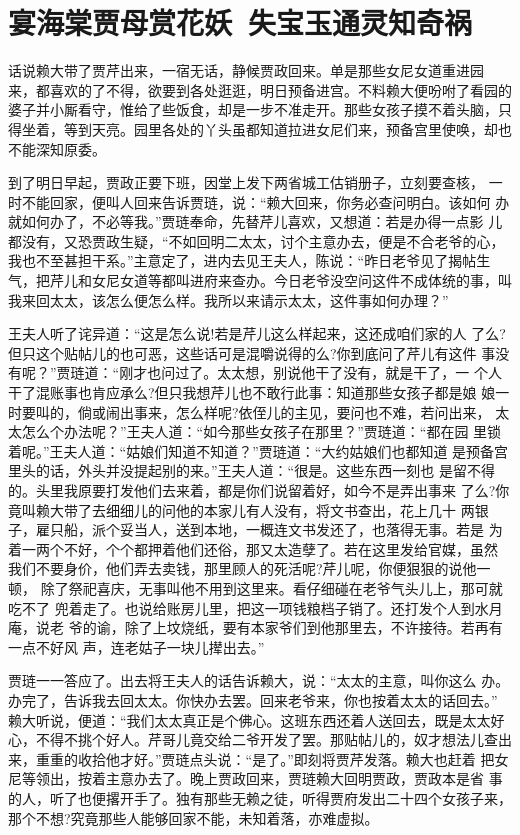 \chapter{宴海棠贾母赏花妖~失宝玉通灵知奇祸}

话说赖大带了贾芹出来，一宿无话，静候贾政回来。单是那些女尼女道重进园
来，都喜欢的了不得，欲要到各处逛逛，明日预备进宫。不料赖大便吩咐了看园的
婆子并小厮看守，惟给了些饭食，却是一步不准走开。那些女孩子摸不着头脑，只
得坐着，等到天亮。园里各处的丫头虽都知道拉进女尼们来，预备宫里使唤，却也
不能深知原委。

到了明日早起，贾政正要下班，因堂上发下两省城工估销册子，立刻要查核，
一时不能回家，便叫人回来告诉贾琏，说：“赖大回来，你务必查问明白。该如何
办就如何办了，不必等我。”贾琏奉命，先替芹儿喜欢，又想道：若是办得一点影
儿都没有，又恐贾政生疑，“不如回明二太太，讨个主意办去，便是不合老爷的心，
我也不至甚担干系。”主意定了，进内去见王夫人，陈说：“昨日老爷见了揭帖生
气，把芹儿和女尼女道等都叫进府来查办。今日老爷没空问这件不成体统的事，叫
我来回太太，该怎么便怎么样。我所以来请示太太，这件事如何办理？”

王夫人听了诧异道：“这是怎么说!若是芹儿这么样起来，这还成咱们家的人
了么?但只这个贴帖儿的也可恶，这些话可是混嚼说得的么?你到底问了芹儿有这件
事没有呢？”贾琏道：“刚才也问过了。太太想，别说他干了没有，就是干了，一
个人干了混账事也肯应承么?但只我想芹儿也不敢行此事：知道那些女孩子都是娘
娘一时要叫的，倘或闹出事来，怎么样呢?依侄儿的主见，要问也不难，若问出来，
太太怎么个办法呢？”王夫人道：“如今那些女孩子在那里？”贾琏道：“都在园
里锁着呢。”王夫人道：“姑娘们知道不知道？”贾琏道：“大约姑娘们也都知道
是预备宫里头的话，外头并没提起别的来。”王夫人道：“很是。这些东西一刻也
是留不得的。头里我原要打发他们去来着，都是你们说留着好，如今不是弄出事来
了么?你竟叫赖大带了去细细儿的问他的本家儿有人没有，将文书查出，花上几十
两银子，雇只船，派个妥当人，送到本地，一概连文书发还了，也落得无事。若是
为着一两个不好，个个都押着他们还俗，那又太造孽了。若在这里发给官媒，虽然
我们不要身价，他们弄去卖钱，那里顾人的死活呢?芹儿呢，你便狠狠的说他一顿，
除了祭祀喜庆，无事叫他不用到这里来。看仔细碰在老爷气头儿上，那可就吃不了
兜着走了。也说给账房儿里，把这一项钱粮档子销了。还打发个人到水月庵，说老
爷的谕，除了上坟烧纸，要有本家爷们到他那里去，不许接待。若再有一点不好风
声，连老姑子一块儿撵出去。”

贾琏一一答应了。出去将王夫人的话告诉赖大，说：“太太的主意，叫你这么
办。办完了，告诉我去回太太。你快办去罢。回来老爷来，你也按着太太的话回去。”
赖大听说，便道：“我们太太真正是个佛心。这班东西还着人送回去，既是太太好
心，不得不挑个好人。芹哥儿竟交给二爷开发了罢。那贴帖儿的，奴才想法儿查出
来，重重的收拾他才好。”贾琏点头说：“是了。”即刻将贾芹发落。赖大也赶着
把女尼等领出，按着主意办去了。晚上贾政回来，贾琏赖大回明贾政，贾政本是省
事的人，听了也便撂开手了。独有那些无赖之徒，听得贾府发出二十四个女孩子来，
那个不想?究竟那些人能够回家不能，未知着落，亦难虚拟。

